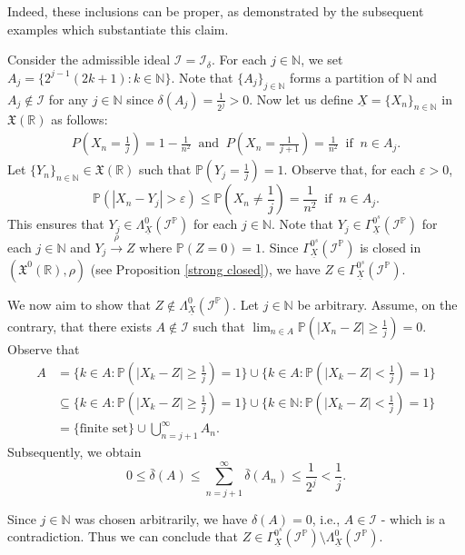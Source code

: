 \documentclass[reqno]{amsart}
\begin{document}
Indeed, these inclusions can be proper, as demonstrated by the subsequent examples which substantiate this claim. 
\begin{example}\label{notclosed}
	Consider the admissible ideal $\mathcal{I}=\mathcal{I}_\delta$.  For each $j\in\mathbb{N}$, we set $A_j=\{2^{j-1}(2k+1):k\in\mathbb{N}\}$. Note that $\{A_j\}_{j\in\mathbb{N}}$ forms a partition of $\mathbb{N}$ and $A_j\notin\mathcal{I}$ for any $j\in\mathbb{N}$ since $\delta(A_j)=\frac{1}{2^j}>0$. Now let us define $\underline{X}=\{X_n\}_{n\in\mathbb{N}}$ in $\mathfrak{X}(\mathbb{R})$ as follows:
	\begin{align*}
		P(X_{n}=\frac{1}{j})=1-\frac{1}{n^2}~\mbox{ and }~ P(X_{n}=\frac{1}{j+1})=\frac{1}{n^2}~\mbox{ if }~n\in A_j.
	\end{align*}
Let $\{Y_n\}_{n\in\mathbb{N}}\in\mathfrak{X}(\mathbb{R})$ such that $\mathbb{P}(Y_j=\frac{1}{j})=1$. 
Observe that, for each $\varepsilon>0$, 
$$
\mathbb{P}(|X_n-Y_j|>\varepsilon)\leq\mathbb{P}(X_n\neq \frac{1}{j})=\frac{1}{n^2}~\mbox{ if }~n\in A_j.
$$
This ensures that $Y_j\in \Lambda^{0}_{\underline{X}}(\mathcal{I}^{\mathbb{P}})$ for each $j\in\mathbb{N}$. Note that $Y_j\in \Gamma^{0^s}_{\underline{X}}(\mathcal{I}^{\mathbb{P}})$ for each $j\in\mathbb{N}$ and $Y_j\xrightarrow{\rho}Z$ where $\mathbb{P}(Z=0)=1$. Since $\Gamma^{0^s}_{\underline{X}}(\mathcal{I}^{\mathbb{P}})$ is closed in $(\mathfrak{X^0(\mathbb{R})},\rho)$ (see Proposition \ref{strong closed}), we have $Z\in \Gamma^{0^s}_{\underline{X}}(\mathcal{I}^{\mathbb{P}})$. 

We now aim to show that $Z\notin \Lambda^{0}_{\underline{X}}(\mathcal{I}^{\mathbb{P}})$. Let $j\in\mathbb{N}$ be arbitrary. Assume, on the contrary, that there exists $A\notin\mathcal{I}$ such that $\displaystyle\lim_{n\in A}\mathbb{P}(|X_n-Z|\geq\frac{1}{j})=0$. Observe that
\begin{align*}
A&= \{k\in A:\mathbb{P}(|X_k-Z|\geq\frac{1}{j})=1\}\cup \{k\in A:\mathbb{P}(|X_k-Z|<\frac{1}{j})=1\}\\
&\subseteq \{k\in A:\mathbb{P}(|X_k-Z|\geq\frac{1}{j})=1\}\cup \{k\in \mathbb{N}:\mathbb{P}(|X_k-Z|<\frac{1}{j})=1\}\\
	&=\{\mbox{finite set}\}\cup\bigcup_{n=j+1}^{\infty}A_n.
\end{align*}	
Subsequently, we obtain
$$
0\leq\bar{\delta}(A)\leq \displaystyle\sum_{n=j+1}^{\infty}\bar{\delta}(A_n)\leq \frac{1}{2^j}<\frac{1}{j}.
$$

Since $j\in\mathbb{N}$ was chosen arbitrarily, we have $\delta(A)=0$, i.e., $A\in\mathcal{I}$ - which is a contradiction. Thus we can conclude that $Z\in\Gamma^{0^s}_{\underline{X}}(\mathcal{I}^{\mathbb{P}})\setminus\Lambda^{0}_{\underline{X}}(\mathcal{I}^{\mathbb{P}})$.
\end{example}
\end{document}
